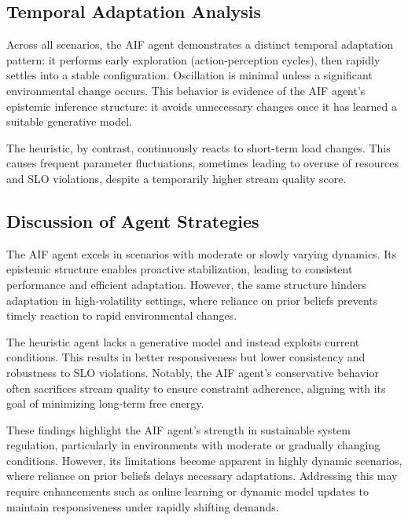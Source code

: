 \subsection{Temporal Adaptation Analysis}
Across all scenarios, the AIF agent demonstrates a distinct temporal adaptation pattern: it performs early exploration (action-perception cycles), then rapidly settles into a stable configuration. Oscillation is minimal unless a significant environmental change occurs. This behavior is evidence of the AIF agent's epistemic inference structure: it avoids unnecessary changes once it has learned a suitable generative model.

The heuristic, by contrast, continuously reacts to short-term load changes. This causes frequent parameter fluctuations, sometimes leading to overuse of resources and SLO violations, despite a temporarily higher stream quality score.


\subsection{Discussion of Agent Strategies}
The AIF agent excels in scenarios with moderate or slowly varying dynamics. Its epistemic structure enables proactive stabilization, leading to consistent performance and efficient adaptation. However, the same structure hinders adaptation in high-volatility settings, where reliance on prior beliefs prevents timely reaction to rapid environmental changes.

The heuristic agent lacks a generative model and instead exploits current conditions. This results in better responsiveness but lower consistency and robustness to SLO violations. Notably, the AIF agent’s conservative behavior often sacrifices stream quality to ensure constraint adherence, aligning with its goal of minimizing long-term free energy.

These findings highlight the AIF agent's strength in sustainable system regulation, particularly in environments with moderate or gradually changing conditions. However, its limitations become apparent in highly dynamic scenarios, where reliance on prior beliefs delays necessary adaptations. Addressing this may require enhancements such as online learning or dynamic model updates to maintain responsiveness under rapidly shifting demands.